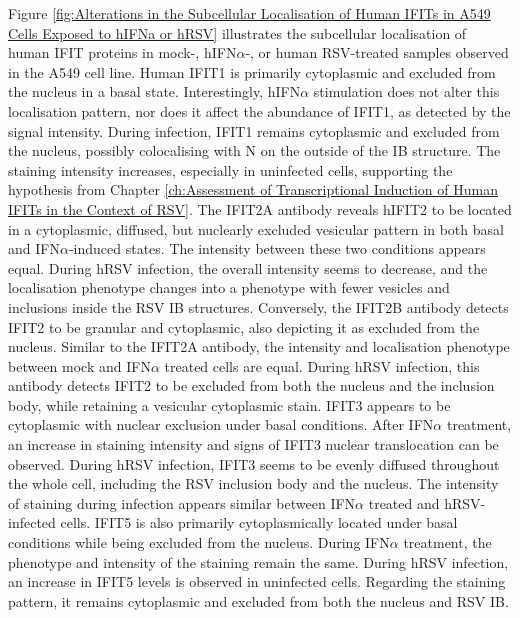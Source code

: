 Figure \ref{fig:Alterations in the Subcellular Localisation of Human IFITs in A549 Cells Exposed to hIFNa or hRSV} illustrates the subcellular localisation of human IFIT proteins in mock-, hIFN\(\alpha\)-, or human RSV-treated samples observed in the A549 cell line. Human IFIT1 is primarily cytoplasmic and excluded from the nucleus in a basal state. Interestingly, hIFN\(\alpha\) stimulation does not alter this localisation pattern, nor does it affect the abundance of IFIT1, as detected by the signal intensity. During infection, IFIT1 remains cytoplasmic and excluded from the nucleus, possibly colocalising with N on the outside of the IB structure. The staining intensity increases, especially in uninfected cells, supporting the hypothesis from Chapter \ref{ch:Assessment of Transcriptional Induction of Human IFITs in the Context of RSV}. The IFIT2A antibody reveals hIFIT2 to be located in a cytoplasmic, diffused, but nuclearly excluded vesicular pattern in both basal and IFN\(\alpha\)-induced states. The intensity between these two conditions appears equal. During hRSV infection, the overall intensity seems to decrease, and the localisation phenotype changes into a phenotype with fewer vesicles and inclusions inside the RSV IB structures. Conversely, the IFIT2B antibody detects IFIT2 to be granular and cytoplasmic, also depicting it as excluded from the nucleus. Similar to the IFIT2A antibody, the intensity and localisation phenotype between mock and IFN\(\alpha\) treated cells are equal. During hRSV infection, this antibody detects IFIT2 to be excluded from both the nucleus and the inclusion body, while retaining a vesicular cytoplasmic stain. IFIT3 appears to be cytoplasmic with nuclear exclusion under basal conditions. After IFN\(\alpha\) treatment, an increase in staining intensity and signs of IFIT3 nuclear translocation can be observed. During hRSV infection, IFIT3 seems to be evenly diffused throughout the whole cell, including the RSV inclusion body and the nucleus. The intensity of staining during infection appears similar between IFN\(\alpha\) treated and hRSV-infected cells. IFIT5 is also primarily cytoplasmically located under basal conditions while being excluded from the nucleus. During IFN\(\alpha\) treatment, the phenotype and intensity of the staining remain the same. During hRSV infection, an increase in IFIT5 levels is observed in uninfected cells. Regarding the staining pattern, it remains cytoplasmic and excluded from both the nucleus and RSV IB.

